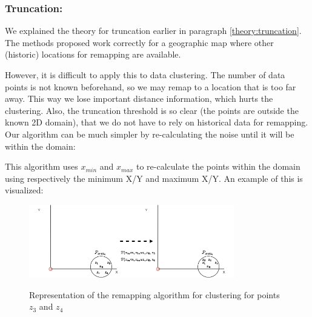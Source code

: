 \subsubsection{Truncation: }
We explained the theory for truncation earlier in paragraph \ref{theory:truncation}.
The methods proposed work correctly for a geographic map where other (historic) locations for remapping are available.

However, it is difficult to apply this to data clustering.
The number of data points is not known beforehand, so we may remap to a location that is too far away.
This way we lose important distance information, which hurts the clustering.
Also, the truncation threshold is so clear (the points are outside the known 2D domain), that we do not have to rely on historical data for remapping.
Our algorithm can be much simpler by re-calculating the noise until it will be within the domain:

This algorithm uses $x_{min}$ and $x_{max}$ to re-calculate the points within the domain using respectively the minimum X/Y and maximum X/Y.
An example of this is visualized:
\begin{figure}[h]
  \includegraphics[width=0.8\textwidth]{Method/images/truncation-rq1.png}
  \label{fig:truncation}
  \centering
  \caption{Representation of the remapping algorithm for clustering for points $z_3$ and $z_4$ }
\end{figure}



